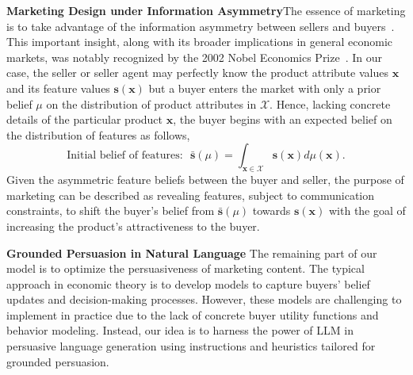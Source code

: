 \textbf{Marketing Design under Information Asymmetry}\quad The essence of marketing is to take advantage of the information asymmetry between sellers and buyers~\citep{grossman1981informational, lewis2011asymmetric, dimoka2012product, kurlat2021signalling}. This important insight, along with its broader implications in general economic markets, was notably recognized by the 2002 Nobel Economics Prize~\citep{akerlof1978market, spence1978job, stiglitz1975theory, lofgren2002markets}. 
In our case, the seller or seller agent may perfectly know the product attribute values $\mathbf{x}$ and its feature values $\mathbf{s}(\mathbf{x})$ but a buyer enters the market with only a prior belief $\mu$ on the distribution of product attributes in $\mathcal{X}$. Hence, lacking concrete details of the particular product $\mathbf{x}$, the buyer begins with an expected belief on the distribution of features as follows,
 \begin{equation}
     \text{Initial belief of features: } \,\,  \bar{\mathbf{s}}(\mu) = \int_{\mathbf{x} \in \mathcal{X}} \mathbf{s}(\mathbf{x}) d \mu( \mathbf{x}). 
 \end{equation}
Given the asymmetric feature beliefs between the buyer and seller, the purpose of marketing can be described as revealing features, subject to communication constraints, to shift the buyer's belief from $\bar{\mathbf{s}}(\mu)$ towards $\mathbf{s}(\mathbf{x})$ with the goal of increasing the product's attractiveness to the buyer.   

 \textbf{Grounded Persuasion in Natural Language}\quad
 The remaining part of our model is to optimize the persuasiveness of marketing content.  The typical approach in economic theory is to develop models to capture buyers' belief updates and decision-making processes. However, these models are challenging to implement in practice due to the lack of concrete buyer utility functions and behavior modeling. Instead, our idea is to harness the power of LLM in persuasive language generation using instructions and heuristics tailored for grounded persuasion.


